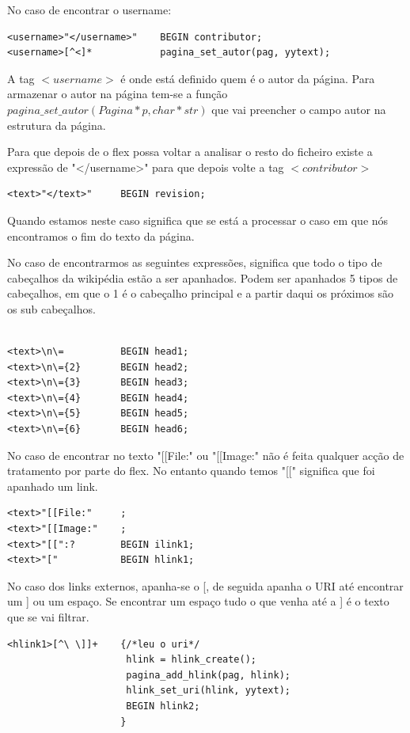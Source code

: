 \documentclass[11pt, a4paper, oneside]{article}
\begin{document}
No caso de encontrar o  username:
\begin{verbatim}
<username>"</username>"    BEGIN contributor;
<username>[^<]*            pagina_set_autor(pag, yytext);
\end{verbatim}


A tag \begin{math}<username>\end{math} é onde está definido quem é o autor da página. Para armazenar o autor na página tem-se a função\begin{math}pagina\_set\_autor(Pagina* p, char* str)\end{math} que vai preencher o campo autor na estrutura da página.


Para que depois de o flex possa voltar a analisar o resto do ficheiro existe a expressão de "</username>" para que depois volte a tag \begin{math}<contributor>\end{math}

\begin{verbatim}
<text>"</text>"     BEGIN revision;
\end{verbatim}

Quando estamos neste caso significa que se está a processar o caso em que nós encontramos o fim do texto da página.


No caso de encontrarmos as seguintes expressões, significa que todo o tipo de cabeçalhos da wikipédia estão a ser apanhados. Podem ser apanhados 5 tipos de cabeçalhos, em que o 1 é o cabeçalho principal e a partir daqui os próximos são os sub cabeçalhos.

\begin{verbatim}

<text>\n\=          BEGIN head1;
<text>\n\={2}       BEGIN head2;
<text>\n\={3}       BEGIN head3;
<text>\n\={4}       BEGIN head4;
<text>\n\={5}       BEGIN head5;
<text>\n\={6}       BEGIN head6;
\end{verbatim}

No caso de encontrar no texto "[[File:" ou "[[Image:" não é feita qualquer acção de tratamento por parte do flex. No entanto quando temos "[[" significa que foi apanhado um link.

\begin{verbatim}
<text>"[[File:"     ;
<text>"[[Image:"    ;
<text>"[[":?        BEGIN ilink1;
<text>"["           BEGIN hlink1;
\end{verbatim}

No caso dos links externos, apanha-se o [, de seguida apanha o URI até encontrar um ] ou um espaço. Se encontrar um espaço tudo o que venha até a ]  é o texto que se vai filtrar.
\begin{verbatim}
<hlink1>[^\ \]]+    {/*leu o uri*/
                     hlink = hlink_create();
                     pagina_add_hlink(pag, hlink);
                     hlink_set_uri(hlink, yytext);
                     BEGIN hlink2;
                    }
\end{verbatim}
\end{document}
